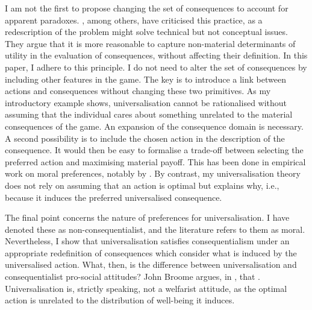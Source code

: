 I am not the first to propose changing the set of consequences to account for apparent paradoxes. \cite{baccelliCanRedescriptionsOutcomes2022}, among others, have criticised this practice, as a redescription of the problem might solve technical but not conceptual issues. They argue that it is more reasonable to capture non-material determinants of utility in the evaluation of consequences, without affecting their definition. In this paper, I adhere to this principle. I do not need to alter the set of consequences by including other features in the game. The key is to introduce a link between actions and consequences without changing these two primitives. As my introductory example shows, universalisation cannot be rationalised without assuming that the individual cares about something unrelated to the material consequences of the game. An expansion of the consequence domain is necessary. A second possibility is to include the chosen action in the description of the consequence. It would then be easy to formalise a trade-off between selecting the preferred action and maximising material payoff. This has been done in empirical work on moral preferences, notably by \cite{cappelenPluralismFairnessIdeals2007}. By contrast, my universalisation theory does not rely on assuming that an action is optimal but explains why, i.e., because it induces the preferred universalised consequence.

The final point concerns the nature of preferences for universalisation. I have denoted these as non-consequentialist, and the literature refers to them as moral. Nevertheless, I show that universalisation satisfies consequentialism under an appropriate redefinition of consequences which consider what is induced by the universalised action. What, then, is the difference between universalisation and consequentialist pro-social attitudes? John Broome argues, in \citet[p. 120]{bradleyJohnBroome2021}, that . Universalisation is, strictly speaking, not a welfarist attitude, as the optimal action is unrelated to the distribution of well-being it induces.

